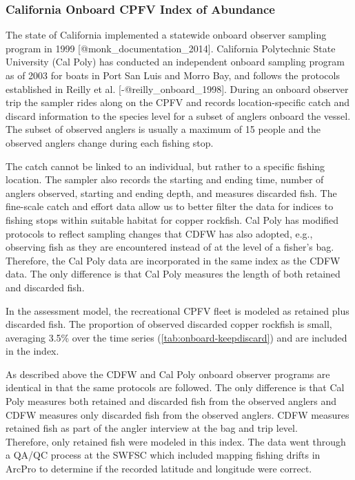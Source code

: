 \documentclass[11pt,
  letterpaper,
]{article}
\begin{document}
\subsubsection{California Onboard CPFV Index of Abundance}\label{onboard-cpfv-index}

The state of California implemented a statewide onboard observer sampling program in 1999 {[}@monk\_documentation\_2014{]}. California Polytechnic State University (Cal Poly) has conducted an independent onboard sampling program as of 2003 for boats in Port San Luis and Morro Bay, and follows the protocols established in Reilly et al. {[}-@reilly\_onboard\_1998{]}. During an onboard observer trip the sampler rides along on the CPFV and records location-specific catch and discard information to the species level for a subset of anglers onboard the vessel. The subset of observed anglers is usually a maximum of 15 people and the observed anglers change during each fishing stop.

The catch cannot be linked to an individual, but rather to a specific fishing location. The sampler also records the starting and ending time, number of anglers observed, starting and ending depth, and measures discarded fish. The fine-scale catch and effort data allow us to better filter the data for indices to fishing stops within suitable habitat for copper rockfish. Cal Poly has modified protocols to reflect sampling changes that CDFW has also adopted, e.g., observing fish as they are encountered instead of at the level of a fisher's bag. Therefore, the Cal Poly data are incorporated in the same index as the CDFW data. The only difference is that Cal Poly measures the length of both retained and discarded fish.

In the assessment model, the recreational CPFV fleet is modeled as retained plus discarded fish. The proportion of observed discarded copper rockfish is small, averaging 3.5\% over the time series (\ref{tab:onboard-keepdiscard}) and are included in the index.

As described above the CDFW and Cal Poly onboard observer programs are identical in that the same protocols are followed. The only difference is that Cal Poly measures both retained and discarded fish from the observed anglers and CDFW measures only discarded fish from the observed anglers. CDFW measures retained fish as part of the angler interview at the bag and trip level.\\
Therefore, only retained fish were modeled in this index. The data went through a QA/QC process at the SWFSC which included mapping fishing drifts in ArcPro to determine if the recorded latitude and longitude were correct.
\end{document}

